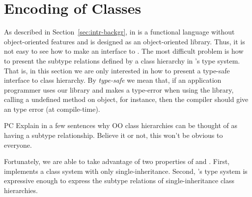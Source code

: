 \documentclass[workingdraft]{usetex-v1}
\begin{document}

\section{Encoding of Classes}
\label{sec:encoding-classes}

As described in Section~\ref{sec:intr-backgr}, \sml in is a functional
language without object-oriented features and \gtk is designed as an
object-oriented library.  Thus, it is not easy to see how to make an \sml
interface to \gtk.  The most difficult problem is how to present the
subtype relations defined by a class hierarchy in \sml's type system.
That is, in this section we are only interested in how to present a
type-safe \sml interface to \gtk class hierarchy.  By \emph{type-safe} we
mean that, if an \sml application programmer uses our library and
makes a type-error when using the \gtk library, calling a undefined
method on object, for instance, then the \sml compiler should give an
type error (at compile-time).


\begin{ednote}{PC}
    Explain in a few sentences why OO class hierarchies can be
  thought of as having a subtype relationship.  Believe it or
  not, this won't be obvious to everyone.
\end{ednote}

Fortunately, we are able to take advantage of two properties of \gtk
and \sml.  First, \gtk implements a class system with only
single-inheritance.  Second, \sml's type system is expressive enough
to express the subtype relations of single-inheritance class
hierarchies.
\end{document}
